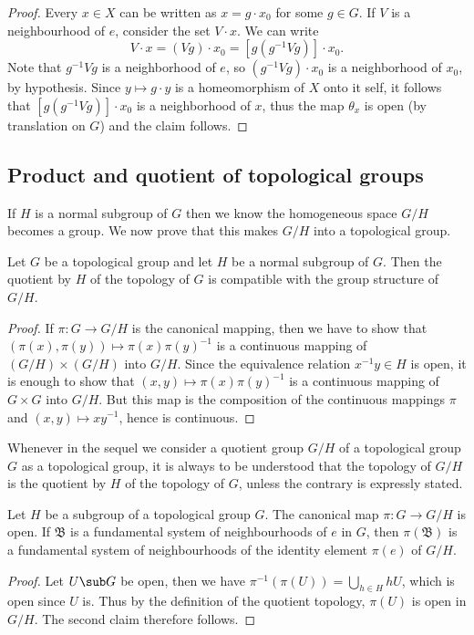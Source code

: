 \begin{proof}
Every $x\in X$ can be written as $x=g\cdot x_0$ for some $g\in G$. If $V$ is a neighbourhood of $e$, consider the set $V\cdot x$. We can write 
\[V\cdot x=(Vg)\cdot x_0=[g(g^{-1}Vg)]\cdot x_0.\]
Note that $g^{-1}Vg$ is a neighborhood of $e$, so $(g^{-1}Vg)\cdot x_0$ is a neighborhood of $x_0$, by hypothesis. Since $y\mapsto g\cdot y$ is a homeomorphism of $X$ onto it self, it follows that $[g(g^{-1}Vg)]\cdot x_0$ is a neighborhood of $x$, thus the map $\theta_x$ is open (by translation on $G$) and the claim follows.
\end{proof}
\subsection{Product and quotient of topological groups}
If $H$ is a normal subgroup of $G$ then we know the homogeneous space $G/H$ becomes a group. We now prove that this makes $G/H$ into a topological group.
\begin{proposition}
Let $G$ be a topological group and let $H$ be a normal subgroup of $G$. Then the quotient by $H$ of the topology of $G$ is compatible with the group structure of $G/H$.
\end{proposition}
\begin{proof}
If $\pi:G\to G/H$ is the canonical mapping, then we have to show that $(\pi(x),\pi(y))\mapsto\pi(x)\pi(y)^{-1}$ is a continuous mapping of $(G/H)\times(G/H)$ into $G/H$. Since the equivalence relation $x^{-1}y\in H$ is open, it is enough to show that $(x,y)\mapsto\pi(x)\pi(y)^{-1}$ is a continuous mapping of $G\times G$ into $G/H$. But this map is the composition of the continuous mappings $\pi$ and $(x,y)\mapsto xy^{-1}$, hence is continuous.
\end{proof}
Whenever in the sequel we consider a quotient group $G/H$ of a topological group $G$ as a topological group, it is always to be understood that the topology of $G/H$ is the quotient by $H$ of the topology of $G$, unless the contrary is expressly stated.
\begin{proposition}\label{topological group quotient map open}
Let $H$ be a subgroup of a topological group $G$. The canonical map $\pi:G\to G/H$ is open. If $\mathfrak{B}$ is a fundamental system of neighbourhoods of $e$ in $G$, then $\pi(\mathfrak{B})$ is a fundamental system of neighbourhoods of the identity element $\pi(e)$ of $G/H$.
\end{proposition}
\begin{proof}
Let $U\sub G$ be open, then we have $\pi^{-1}(\pi(U))=\bigcup_{h\in H}hU$, which is open since $U$ is. Thus by the definition of the quotient topology, $\pi(U)$ is open in $G/H$. The second claim therefore follows.
\end{proof}
